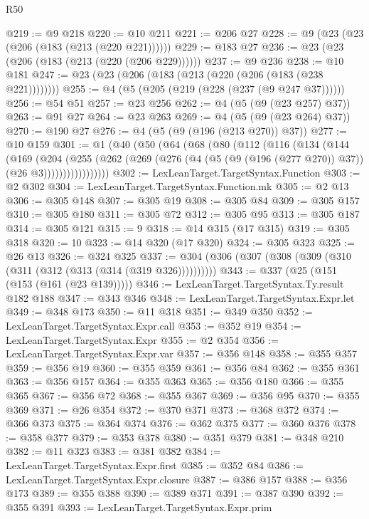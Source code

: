 \begin{lexlean}{R50}
\begin{coremodule}
@219 := @9 @218
@220 := @10 @211
@221 := @206 @27
@228 := @9 (@23 (@23 (@206 (@183 (@213 (@220 @221))))))
@229 := @183 @27
@236 := @23 (@23 (@206 (@183 (@213 (@220 (@206 @229))))))
@237 := @9 @236
@238 := @10 @181
@247 := @23 (@23 (@206 (@183 (@213 (@220 (@206 (@183 (@238 @221))))))))
@255 := @4 (@5 (@205 (@219 (@228 (@237 (@9 @247 @37))))))
@256 := @54 @51
@257 := @23 @256
@262 := @4 (@5 (@9 (@23 @257) @37))
@263 := @91 @27
@264 := @23 @263
@269 := @4 (@5 (@9 (@23 @264) @37))
@270 := @190 @27
@276 := @4 (@5 (@9 (@196 (@213 @270)) @37))
@277 := @10 @159
@301 := @1
    (@40
      (@50
        (@64
          (@68
            (@80
              (@112
                (@116
                  (@134
                    (@144
                      (@169
                        (@204
                          (@255
                            (@262
                              (@269
                                (@276 (@4 (@5 (@9 (@196 (@277 @270)) @37)) (@26 @3)))))))))))))))))
@302 := LexLeanTarget.TargetSyntax.Function
@303 := @2 @302
@304 := LexLeanTarget.TargetSyntax.Function.mk
@305 := @2 @13
@306 := @305 @148
@307 := @305 @19
@308 := @305 @84
@309 := @305 @157
@310 := @305 @180
@311 := @305 @72
@312 := @305 @95
@313 := @305 @187
@314 := @305 @121
@315 := 9
@318 := @14 @315 (@17 @315)
@319 := @305 @318
@320 := 10
@323 := @14 @320 (@17 @320)
@324 := @305 @323
@325 := @26 @13
@326 := @324 @325
@337 := @304 (@306 (@307 (@308 (@309 (@310 (@311 (@312 (@313 (@314 (@319 @326))))))))))
@343 := @337 (@25 (@151 (@153 (@161 (@23 @139)))))
@346 := LexLeanTarget.TargetSyntax.Ty.result @182 @188
@347 := @343 @346
@348 := LexLeanTarget.TargetSyntax.Expr.let
@349 := @348 @173
@350 := @11 @318
@351 := @349 @350
@352 := LexLeanTarget.TargetSyntax.Expr.call
@353 := @352 @19
@354 := LexLeanTarget.TargetSyntax.Expr
@355 := @2 @354
@356 := LexLeanTarget.TargetSyntax.Expr.var
@357 := @356 @148
@358 := @355 @357
@359 := @356 @19
@360 := @355 @359
@361 := @356 @84
@362 := @355 @361
@363 := @356 @157
@364 := @355 @363
@365 := @356 @180
@366 := @355 @365
@367 := @356 @72
@368 := @355 @367
@369 := @356 @95
@370 := @355 @369
@371 := @26 @354
@372 := @370 @371
@373 := @368 @372
@374 := @366 @373
@375 := @364 @374
@376 := @362 @375
@377 := @360 @376
@378 := @358 @377
@379 := @353 @378
@380 := @351 @379
@381 := @348 @210
@382 := @11 @323
@383 := @381 @382
@384 := LexLeanTarget.TargetSyntax.Expr.first
@385 := @352 @84
@386 := LexLeanTarget.TargetSyntax.Expr.closure
@387 := @386 @157
@388 := @356 @173
@389 := @355 @388
@390 := @389 @371
@391 := @387 @390
@392 := @355 @391
@393 := LexLeanTarget.TargetSyntax.Expr.prim

\end{coremodule}
\end{lexlean}
